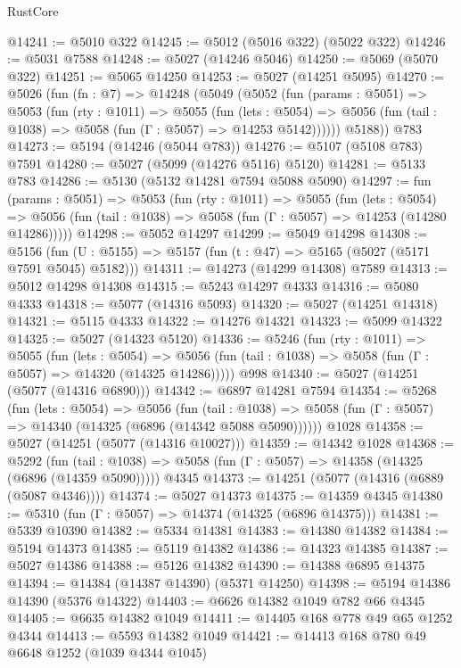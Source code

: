 \begin{lexlean}{RustCore}
\begin{coremodule}
@14241 := @5010 @322
@14245 := @5012 (@5016 @322) (@5022 @322)
@14246 := @5031 @7588
@14248 := @5027 (@14246 @5046)
@14250 := @5069 (@5070 @322)
@14251 := @5065 @14250
@14253 := @5027 (@14251 @5095)
@14270 := @5026
    (fun (fn : @7) =>
    @14248
      (@5049
        (@5052
          (fun (params : @5051) =>
          @5053
            (fun (rty : @1011) =>
            @5055
              (fun (lets : @5054) =>
              @5056 (fun (tail : @1038) => @5058 (fun (Γ : @5057) => @14253 @5142))))))
        @5188))
    @783
@14273 := @5194 (@14246 (@5044 @783))
@14276 := @5107 (@5108 @783) @7591
@14280 := @5027 (@5099 (@14276 @5116) @5120)
@14281 := @5133 @783
@14286 := @5130 (@5132 @14281 @7594 @5088 @5090)
@14297 := fun (params : @5051) =>
  @5053
    (fun (rty : @1011) =>
    @5055
      (fun (lets : @5054) =>
      @5056 (fun (tail : @1038) => @5058 (fun (Γ : @5057) => @14253 (@14280 @14286)))))
@14298 := @5052 @14297
@14299 := @5049 @14298
@14308 := @5156
    (fun (U : @5155) => @5157 (fun (t : @47) => @5165 (@5027 (@5171 @7591 @5045) @5182)))
@14311 := @14273 (@14299 @14308) @7589
@14313 := @5012 @14298 @14308
@14315 := @5243 @14297 @4333
@14316 := @5080 @4333
@14318 := @5077 (@14316 @5093)
@14320 := @5027 (@14251 @14318)
@14321 := @5115 @4333
@14322 := @14276 @14321
@14323 := @5099 @14322
@14325 := @5027 (@14323 @5120)
@14336 := @5246
    (fun (rty : @1011) =>
    @5055
      (fun (lets : @5054) =>
      @5056 (fun (tail : @1038) => @5058 (fun (Γ : @5057) => @14320 (@14325 @14286)))))
    @998
@14340 := @5027 (@14251 (@5077 (@14316 @6890)))
@14342 := @6897 @14281 @7594
@14354 := @5268
    (fun (lets : @5054) =>
    @5056
      (fun (tail : @1038) =>
      @5058 (fun (Γ : @5057) => @14340 (@14325 (@6896 (@14342 @5088 @5090))))))
    @1028
@14358 := @5027 (@14251 (@5077 (@14316 @10027)))
@14359 := @14342 @1028
@14368 := @5292
    (fun (tail : @1038) => @5058 (fun (Γ : @5057) => @14358 (@14325 (@6896 (@14359 @5090)))))
    @4345
@14373 := @14251 (@5077 (@14316 (@6889 (@5087 @4346))))
@14374 := @5027 @14373
@14375 := @14359 @4345
@14380 := @5310 (fun (Γ : @5057) => @14374 (@14325 (@6896 @14375)))
@14381 := @5339 @10390
@14382 := @5334 @14381
@14383 := @14380 @14382
@14384 := @5194 @14373
@14385 := @5119 @14382
@14386 := @14323 @14385
@14387 := @5027 @14386
@14388 := @5126 @14382
@14390 := @14388 @6895 @14375
@14394 := @14384 (@14387 @14390) (@5371 @14250)
@14398 := @5194 @14386 @14390 (@5376 @14322)
@14403 := @6626 @14382 @1049 @782 @66 @4345
@14405 := @6635 @14382 @1049
@14411 := @14405 @168 @778 @49 @65 @1252 @4344
@14413 := @5593 @14382 @1049
@14421 := @14413 @168 @780 @49 @6648 @1252 (@1039 @4344 @1045)

\end{coremodule}
\end{lexlean}
